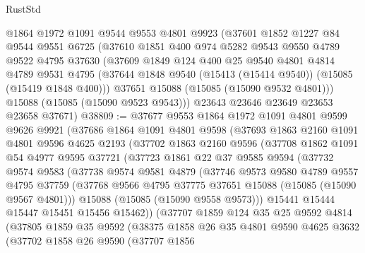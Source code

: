 \begin{lexlean}{RustStd}
\begin{coremodule}
    @1864
    @1972
    @1091
    @9544
    @9553
    @4801
    @9923
    (@37601
      @1852
      @1227
      @84
      @9544
      @9551
      @6725
      (@37610
        @1851
        @400
        @974
        @5282
        @9543
        @9550
        @4789
        @9522
        @4795
        @37630
        (@37609
          @1849
          @124
          @400
          @25
          @9540
          @4801
          @4814
          @4789
          @9531
          @4795
          (@37644 @1848 @9540 (@15413 (@15414 @9540)) (@15085 (@15419 @1848 @400)))
          @37651
          @15088
          (@15085 (@15090 @9532 @4801)))
        @15088
        (@15085 (@15090 @9523 @9543)))
      @23643
      @23646
      @23649
      @23653
      @23658
      @37671)
@38809 := @37677
    @9553
    @1864
    @1972
    @1091
    @4801
    @9599
    @9626
    @9921
    (@37686
      @1864
      @1091
      @4801
      @9598
      (@37693
        @1863
        @2160
        @1091
        @4801
        @9596
        @4625
        @2193
        (@37702
          @1863
          @2160
          @9596
          (@37708
            @1862
            @1091
            @54
            @4977
            @9595
            @37721
            (@37723
              @1861
              @22
              @37
              @9585
              @9594
              (@37732
                @9574
                @9583
                (@37738
                  @9574
                  @9581
                  @4879
                  (@37746
                    @9573
                    @9580
                    @4789
                    @9557
                    @4795
                    @37759
                    (@37768 @9566 @4795 @37775 @37651 @15088 (@15085 (@15090 @9567 @4801)))
                    @15088
                    (@15085 (@15090 @9558 @9573)))
                  @15441
                  @15444
                  @15447
                  @15451
                  @15456
                  @15462))
              (@37707
                @1859
                @124
                @35
                @25
                @9592
                @4814
                (@37805
                  @1859
                  @35
                  @9592
                  (@38375
                    @1858
                    @26
                    @35
                    @4801
                    @9590
                    @4625
                    @3632
                    (@37702
                      @1858
                      @26
                      @9590
                      (@37707
                        @1856

\end{coremodule}
\end{lexlean}
